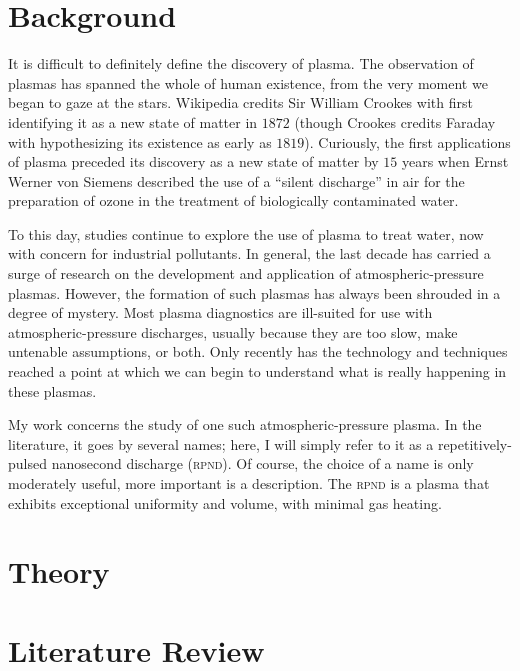 \section{Background}
It is difficult to definitely define the discovery of plasma. The observation of
plasmas has spanned the whole of human existence, from the very moment we began
to gaze at the stars. Wikipedia credits Sir William Crookes with first
identifying it as a new state of matter in $1872$ (though Crookes credits
Faraday with hypothesizing its existence as early as $1819$). Curiously, the
first applications of plasma preceded its discovery as a new state of matter by
$15$ years when Ernst Werner von Siemens described the use of a ``silent
discharge'' in air for the preparation of ozone in the treatment of biologically
contaminated water.

To this day, studies continue to explore the use of plasma to treat water, now
with concern for industrial pollutants. In general, the last decade has carried
a surge of research on the development and application of atmospheric-pressure
plasmas. However, the formation of such plasmas has always been shrouded in a
degree of mystery. Most plasma diagnostics are ill-suited for use with
atmospheric-pressure discharges, usually because they are too slow, make
untenable assumptions, or both. Only recently has the technology and techniques
reached a point at which we can begin to understand what is really happening in
these plasmas.

My work concerns the study of one such atmospheric-pressure plasma. In the
literature, it goes by several names; here, I will simply refer to it as a
repetitively-pulsed nanosecond discharge (\textsc{rpnd}). Of course, the choice
of a name is only moderately useful, more important is a description. The
\textsc{rpnd} is a plasma that exhibits exceptional uniformity and volume, with
minimal gas heating.

\section{Theory}

\section{Literature Review}

